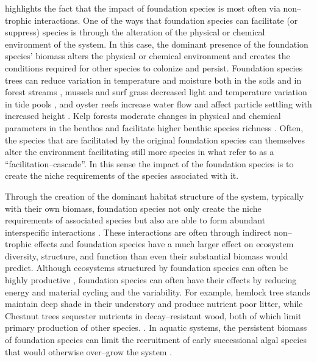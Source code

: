\documentclass{article}
\begin{document}
 highlights the fact that the impact of foundation species is most often via non--trophic interactions. One of the ways that foundation species can facilitate (or suppress) species is through the alteration of the physical or chemical environment of the system. In this case, the dominant presence of the foundation species' biomass alters the physical or chemical environment and creates the conditions required for other species to colonize and persist. Foundation species trees can reduce variation in temperature and moisture both in the soils and in forest streams \cite{ellison_loss_2005}, mussels and surf grass decreased light and temperature variation in tide pools \cite{fields_foundation_2022}, and oyster reefs increase water flow and affect particle settling with increased height \cite{lenihan_physicalbiological_1999}. Kelp forests moderate changes in physical and chemical parameters in the benthos and facilitate higher benthic species richness \cite{lamy_foundation_2020}. Often, the species that are facilitated by the original foundation species can themselves alter the environment facilitating still more species in what  refer to as a ``facilitation--cascade''. In this sense the impact of the foundation species is to create the niche requirements of the species associated with it. 

Through the creation of the dominant habitat structure of the system, typically with their own biomass, foundation species not only create the niche requirements of associated species but also are able to form abundant interspecific interactions \cite{angelini_interactions_2011, ellison_foundation_2019}. These interactions are often through indirect non--trophic effects \cite{ellison_foundation_2019} and foundation species have a much larger effect on ecosystem diversity, structure, and function than even their substantial biomass would predict. Although ecosystems structured by foundation species can often be highly productive \cite{wong_evaluating_2011}, foundation species can often have their effects by reducing energy and material cycling and the variability. For example, hemlock tree stands maintain deep shade in their understory and produce nutrient poor litter, while Chestnut trees sequester nutrients in decay--resistant wood, both of which limit primary production of other species. \cite{ellison_loss_2005}. In aquatic systems, the persistent biomass of foundation species can limit the recruitment of early successional algal species that would otherwise over--grow the system \cite{fields_foundation_2022, CORAL_EXAMPLE}. %
\end{document}
